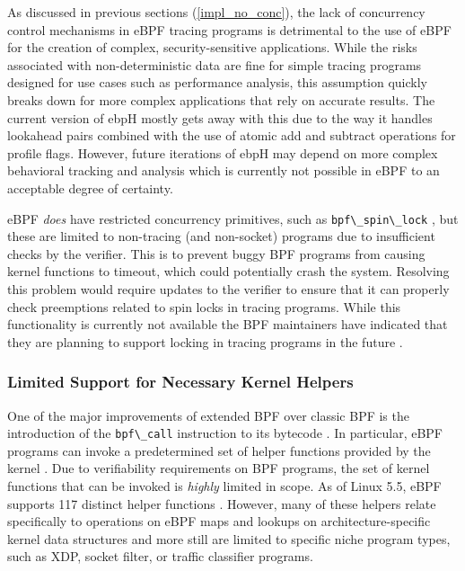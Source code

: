 \documentclass[
  12pt]{findlay}
\newcommand{\passthrough}[1]{#1}
\begin{document}
As discussed in previous sections (\autoref{impl_no_conc}), the lack of
concurrency control mechanisms in eBPF tracing programs
\autocite{verifier_git,bpf_h_git} is detrimental to the use of eBPF for
the creation of complex, security-sensitive applications. While the
risks associated with non-deterministic data are fine for simple tracing
programs designed for use cases such as performance analysis, this
assumption quickly breaks down for more complex applications that rely
on accurate results. The current version of ebpH mostly gets away with
this due to the way it handles lookahead pairs combined with the use of
atomic add and subtract operations for profile flags. However, future
iterations of ebpH may depend on more complex behavioral tracking and
analysis which is currently not possible in eBPF to an acceptable degree
of certainty.

eBPF \emph{does} have restricted concurrency primitives, such as
\passthrough{\lstinline!bpf\_spin\_lock!} \autocite{bpf_h_git}, but
these are limited to non-tracing (and non-socket) programs due to
insufficient checks by the verifier. This is to prevent buggy BPF
programs from causing kernel functions to timeout, which could
potentially crash the system. Resolving this problem would require
updates to the verifier to ensure that it can properly check preemptions
related to spin locks in tracing programs. While this functionality is
currently not available the BPF maintainers have indicated that they are
planning to support locking in tracing programs in the future
\autocite{bpf_h_git}.

\hypertarget{limited-support-for-necessary-kernel-helpers}{%
\subsubsection{Limited Support for Necessary Kernel
Helpers}\label{limited-support-for-necessary-kernel-helpers}}

One of the major improvements of extended BPF over classic BPF is the
introduction of the \passthrough{\lstinline!bpf\_call!} instruction to
its bytecode \autocite{starovoitov13,starovoitov14}. In particular, eBPF
programs can invoke a predetermined set of helper functions provided by
the kernel \autocite{gregg19bpf,man_bpf_helpers}. Due to verifiability
requirements on BPF programs, the set of kernel functions that can be
invoked is \emph{highly} limited in scope. As of Linux 5.5, eBPF
supports 117 distinct helper functions \autocite{bpf_h_git}. However,
many of these helpers relate specifically to operations on eBPF maps and
lookups on architecture-specific kernel data structures and more still
are limited to specific niche program types, such as XDP, socket filter,
or traffic classifier programs.
\end{document}
